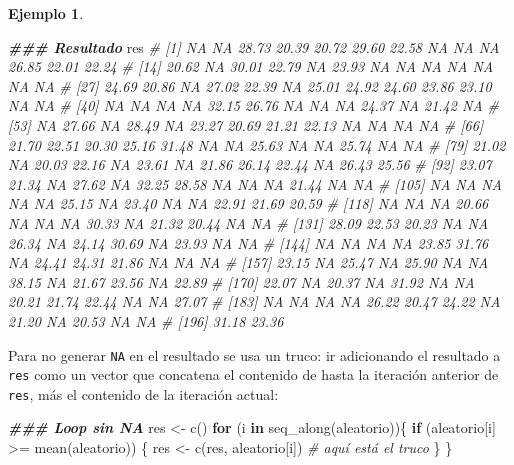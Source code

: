 \documentclass[
]{article}
\newenvironment{Shaded}{\begin{snugshade}}{\end{snugshade}}
\newcommand{\CommentTok}[1]{\textcolor[rgb]{0.56,0.35,0.01}{\textit{#1}}}
\newcommand{\ControlFlowTok}[1]{\textcolor[rgb]{0.13,0.29,0.53}{\textbf{#1}}}
\newcommand{\DocumentationTok}[1]{\textcolor[rgb]{0.56,0.35,0.01}{\textbf{\textit{#1}}}}
\newcommand{\FunctionTok}[1]{\textcolor[rgb]{0.00,0.00,0.00}{#1}}
\newcommand{\NormalTok}[1]{#1}
\newcommand{\OtherTok}[1]{\textcolor[rgb]{0.56,0.35,0.01}{#1}}
\newcommand{\SpecialCharTok}[1]{\textcolor[rgb]{0.00,0.00,0.00}{#1}}
\theoremstyle{definition}
\theoremstyle{definition}
\newtheorem{example}{Ejemplo}[section]
\theoremstyle{definition}
\theoremstyle{definition}
\theoremstyle{remark}
\begin{document}
\begin{example}
\begin{Shaded}
\begin{Highlighting}[]
\DocumentationTok{\#\#\# Resultado}
\NormalTok{res}
\CommentTok{\#   [1]    NA    NA 28.73 20.39 20.72 29.60 22.58    NA    NA    NA 26.85 22.01 22.24}
\CommentTok{\#  [14] 20.62    NA 30.01 22.79    NA 23.93    NA    NA    NA    NA    NA    NA    NA}
\CommentTok{\#  [27] 24.69 20.86    NA 27.02 22.39    NA 25.01 24.92 24.60 23.86 23.10    NA    NA}
\CommentTok{\#  [40]    NA    NA    NA    NA 32.15 26.76    NA    NA    NA 24.37    NA 21.42    NA}
\CommentTok{\#  [53]    NA 27.66    NA 28.49    NA 23.27 20.69 21.21 22.13    NA    NA    NA    NA}
\CommentTok{\#  [66] 21.70 22.51 20.30 25.16 31.48    NA    NA 25.63    NA    NA 25.74    NA    NA}
\CommentTok{\#  [79] 21.02    NA 20.03 22.16    NA 23.61    NA 21.86 26.14 22.44    NA 26.43 25.56}
\CommentTok{\#  [92] 23.07 21.34    NA 27.62    NA 32.25 28.58    NA    NA    NA 21.44    NA    NA}
\CommentTok{\# [105]    NA    NA    NA    NA    NA 25.15    NA 23.40    NA    NA 22.91 21.69 20.59}
\CommentTok{\# [118]    NA    NA    NA 20.66    NA    NA    NA 30.33    NA 21.32 20.44    NA    NA}
\CommentTok{\# [131] 28.09 22.53 20.23    NA    NA 26.34    NA 24.14 30.69    NA 23.93    NA    NA}
\CommentTok{\# [144]    NA    NA    NA    NA 23.85 31.76    NA 24.41 24.31 21.86    NA    NA    NA}
\CommentTok{\# [157] 23.15    NA 25.47    NA 25.90    NA    NA 38.15    NA 21.67 23.56    NA 22.89}
\CommentTok{\# [170] 22.07    NA 20.37    NA 31.92    NA    NA 20.21 21.74 22.44    NA    NA 27.07}
\CommentTok{\# [183]    NA    NA    NA    NA 26.22 20.47 24.22    NA 21.20    NA 20.53    NA    NA}
\CommentTok{\# [196] 31.18 23.36}
\end{Highlighting}
\end{Shaded}

Para no generar \texttt{NA} en el resultado se usa un truco: ir adicionando el resultado a \texttt{res} como un vector que concatena el contenido de hasta la iteración anterior de \texttt{res}, más el contenido de la iteración actual:

\begin{Shaded}
\begin{Highlighting}[]
\DocumentationTok{\#\#\# Loop sin NA}
\NormalTok{res }\OtherTok{\textless{}{-}} \FunctionTok{c}\NormalTok{()}
\ControlFlowTok{for}\NormalTok{ (i }\ControlFlowTok{in} \FunctionTok{seq\_along}\NormalTok{(aleatorio))\{}
  \ControlFlowTok{if}\NormalTok{ (aleatorio[i] }\SpecialCharTok{\textgreater{}=} \FunctionTok{mean}\NormalTok{(aleatorio)) \{}
\NormalTok{    res }\OtherTok{\textless{}{-}} \FunctionTok{c}\NormalTok{(res, aleatorio[i]) }\CommentTok{\# aquí está el truco}
\NormalTok{  \}}
\NormalTok{\}}


\end{Highlighting}
\end{Shaded}
\end{example}
\end{document}
